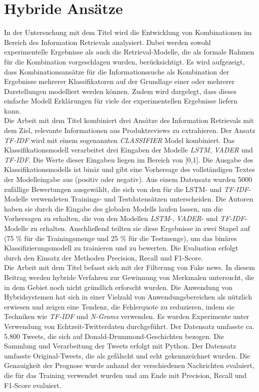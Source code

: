 \section{Hybride Ansätze}
In der Untersuchung mit dem Titel \cite{croft2000combining} wird die Entwicklung von Kombinationen im Bereich des Information Retrievals analysiert. Dabei werden sowohl experimentelle Ergebnisse als auch die Retrieval-Modelle, die als formale Rahmen für die Kombination vorgeschlagen wurden, berücksichtigt. Es wird aufgezeigt, dass Kombinationsansätze für die Informationssuche als Kombination der Ergebnisse mehrerer Klassifikatoren auf der Grundlage einer oder mehrerer Darstellungen modelliert werden können. Zudem wird dargelegt, dass dieses einfache Modell Erklärungen für viele der experimentellen Ergebnisse liefern kann.\\

Die Arbeit mit dem Titel \cite{chiny2021lstm} kombiniert drei Ansätze des Information Retrievals mit dem Ziel, relevante Informationen aus Produktreviews zu extrahieren. Der Ansatz \emph{TF-IDF} wird mit einem sogenannten \emph{CLASSIFIER} Model kombiniert. Das Klassifikationsmodell verarbeitet drei Eingaben der Modelle \emph{LSTM}, \emph{VADER} und \emph{TF-IDF}. Die Werte dieser Eingaben liegen im Bereich von [0,1]. Die Ausgabe des Klassifikationsmodells ist binär und gibt eine Vorhersage des vollständigen Textes der Modelleingabe aus (positiv oder negativ). Aus einem Datensatz wurden 5000 zufällige Bewertungen ausgewählt, die sich von den für die LSTM- und \emph{TF-IDF}-Modelle verwendeten Trainings- und Testdatensätzen unterscheiden. Die Autoren \citeauthor{chiny2021lstm} haben sie durch die Eingabe des globalen Modells laufen lassen, um die Vorhersagen zu erhalten, die von den Modellen \emph{LSTM}-, \emph{VADER}- und \emph{TF-IDF}-Modelle zu erhalten. Anschließend teilten sie diese Ergebnisse in zwei Stapel auf (75 \% für die Trainingsmenge und 25 \% für die Testmenge), um das binäres Klassifizierungsmodell zu trainieren und zu bewerten. Die Evaluation erfolgt durch den Einsatz der Methoden Precision, Recall und F1-Score.\\

Die Arbeit mit dem Titel \cite{suhasini2021hybrid} befasst sich mit der Filterung von Fake news. In diesem Beitrag werden hybride Verfahren zur Gewinnung von Merkmalen untersucht, die in dem Gebiet noch nicht gründlich erforscht wurden. Die Anwendung von Hybridsystemen hat sich in einer Vielzahl von Anwendungsbereichen als nützlich erwiesen und zeigen eine Tendenz, die Fehlerquote zu reduzieren, indem sie Techniken wie \emph{TF-IDF} und \emph{N-Grams} verwenden. Es wurden Experimente unter Verwendung von Echtzeit-Twitterdaten durchgeführt. Der Datensatz umfasste ca. 5.800 Tweets, die sich auf Donald-Drummond-Geschichten bezogen. Die Sammlung und Verarbeitung der Tweets erfolgt mit Python. Der Datensatz umfasste Original-Tweets, die als gefälscht und echt gekennzeichnet wurden. Die Genauigkeit der Prognose wurde anhand der verschiedenen Nachrichten evaluiert, die für das Training verwendet wurden und am Ende mit Precision, Recall und F1-Score evaluiert.\\

